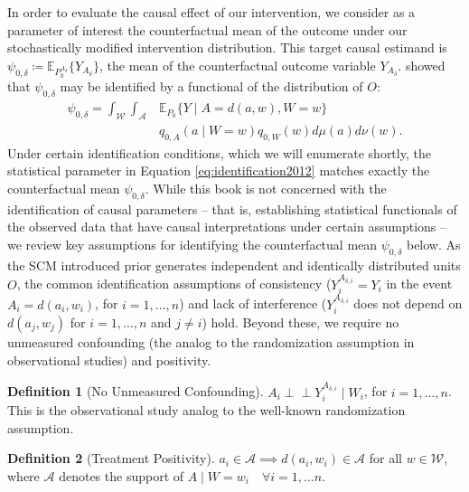 \documentclass[
  12pt, krantz2,
]{krantz}
\newcommand{\E}{\mathbb{E}}
\newcommand{\1}{\mathbbm{1}}
\newcommand{\indep}{\mbox{$\perp\!\!\!\perp$}}
\theoremstyle{definition}
\newtheorem{definition}{Definition}[chapter]
\theoremstyle{definition}
\theoremstyle{definition}
\theoremstyle{definition}
\theoremstyle{remark}
\begin{document}
In order to evaluate the causal effect of our intervention, we consider as a
parameter of interest the counterfactual mean of the outcome under our
stochastically modified intervention distribution. This target causal estimand
is \(\psi_{0, \delta} \coloneqq \E_{P_0^{A_{\delta}}}\{Y_{A_{\delta}}\}\), the
mean of the counterfactual outcome variable \(Y_{A_{\delta}}\).
\citet{diaz2018stochastic} showed that \(\psi_{0, \delta}\) may be identified by a
functional of the distribution of \(O\):
\begin{align}
  \psi_{0,\delta} = \int_{\mathcal{W}} \int_{\mathcal{A}} & \E_{P_0}
   \{Y \mid A = d(a, w), W = w\} \nonumber \\ &q_{0, A}(a \mid W = w)
   q_{0, W}(w) d\mu(a)d\nu(w).
  \label{eq:identification2012}
\end{align}
Under certain identification conditions, which we will enumerate shortly, the
statistical parameter in Equation \eqref{eq:identification2012} matches exactly
the counterfactual mean \(\psi_{0, \delta}\). While this book is not concerned
with the identification of causal parameters -- that is, establishing
statistical functionals of the observed data that have causal interpretations
under certain assumptions -- we review key assumptions for identifying the
counterfactual mean \(\psi_{0, \delta}\) below. As the SCM introduced prior
generates independent and identically distributed units \(O\), the common
identification assumptions of consistency (\(Y^{A_{\delta,i}}_i = Y_i\) in the
event \(A_i = d(a_i, w_i)\), for \(i = 1, \ldots, n\)) and lack of interference
(\(Y^{A_{\delta,i}}_i\) does not depend on \(d(a_j, w_j)\) for \(i = 1, \ldots, n\)
and \(j \neq i\)) hold. Beyond these, we require no unmeasured confounding (the
analog to the randomization assumption in observational studies) and positivity.

\begin{definition}[No Unmeasured Confounding]
\(A_i \indep Y^{A_{\delta,i}}_i \mid W_i\), for \(i = 1, \ldots, n\). This is the
observational study analog to the well-known randomization assumption.
\end{definition}

\begin{definition}[Treatment Positivity]
\(a_i \in \mathcal{A} \implies d(a_i, w_i) \in \mathcal{A}\) for all \(w \in \mathcal{W}\), where \(\mathcal{A}\) denotes the support of \(A \mid W = w_i \quad \forall i = 1, \ldots n\).
\end{definition}
\end{document}
